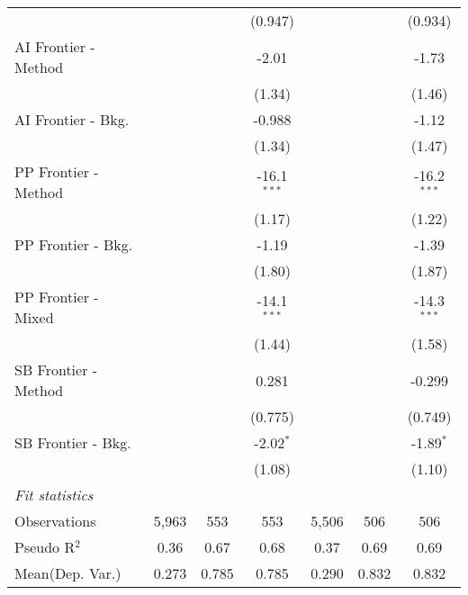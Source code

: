 \begin{tabular}{lcccccc}
                        &              &         & (0.947)       &              &         & (0.934)\\   
   AI Frontier - Method &              &         & -2.01         &              &         & -1.73\\   
                        &              &         & (1.34)        &              &         & (1.46)\\   
   AI Frontier - Bkg.   &              &         & -0.988        &              &         & -1.12\\   
                        &              &         & (1.34)        &              &         & (1.47)\\   
   PP Frontier - Method &              &         & -16.1$^{***}$ &              &         & -16.2$^{***}$\\   
                        &              &         & (1.17)        &              &         & (1.22)\\   
   PP Frontier - Bkg.   &              &         & -1.19         &              &         & -1.39\\   
                        &              &         & (1.80)        &              &         & (1.87)\\   
   PP Frontier - Mixed  &              &         & -14.1$^{***}$ &              &         & -14.3$^{***}$\\   
                        &              &         & (1.44)        &              &         & (1.58)\\   
   SB Frontier - Method &              &         & 0.281         &              &         & -0.299\\   
                        &              &         & (0.775)       &              &         & (0.749)\\   
   SB Frontier - Bkg.   &              &         & -2.02$^{*}$   &              &         & -1.89$^{*}$\\   
                        &              &         & (1.08)        &              &         & (1.10)\\   
   \midrule
   \emph{Fit statistics}\\
   Observations         & 5,963        & 553     & 553           & 5,506        & 506     & 506\\  
   Pseudo R$^2$         & 0.36         & 0.67    & 0.68          & 0.37         & 0.69    & 0.69\\  
Mean(Dep. Var.) & 0.273 & 0.785 & 0.785 & 0.290 & 0.832 & 0.832 \\
   

\end{tabular}
